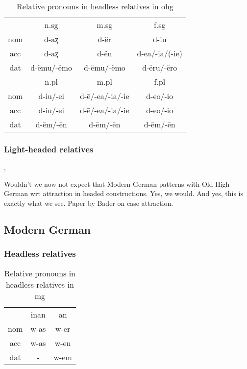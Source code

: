 \begin{table}[H]\label{tbl:paradigmohg}
	\center
	\caption {Relative pronouns in headless relatives in \ac{ohg}}
		\begin{tabular}{cccc}
		\toprule
							& \ac{n}.\ac{sg}	& \ac{m}.\ac{sg}  & \ac{f}.\ac{sg}	\\
								\cmidrule{2-4}
		\ac{nom}	& d-aȥ          	& d-ër       			& d-iu						\\
		\ac{acc}	& d-aȥ   					& d-ën						& d-ea/-ia/(-ie)	\\
		\ac{dat}	& d-ëmu/-ëmo	    & d-ëmu/-ëmo			& d-ëru/-ëro			\\
		\bottomrule
	    				& \ac{n}.\ac{pl}	& \ac{m}.\ac{pl}  	& \ac{f}.\ac{pl}	\\
	    					\cmidrule{2-4}
    \ac{nom} 	& d-iu/-ei   			&  d-ē/-ea/-ia/-ie	& d-eo/-io        \\
    \ac{acc} 	& d-iu/-ei   			&  d-ē/-ea/-ia/-ie	& d-eo/-io        \\
    \ac{dat} 	& d-ēm/-ēn   			&  d-ēm/-ēn       	& d-ēm/-ēn        \\
    \bottomrule
		\end{tabular}
\end{table}

\subsubsection{Light-headed relatives}

, 

Wouldn't we now not expect that Modern German patterns with Old High German wrt attraction in headed constructions. Yes, we would. And yes, this is exactly what we see. Paper by Bader on case attraction.




\subsection{Modern German}

\subsubsection{Headless relatives}


\begin{table}[H]
	\center
	\caption {Relative pronouns in headless relatives in \ac{mg}}
		\begin{tabular}{ccc}
		\toprule
							& \ac{inan}	& \ac{an}	\\
								\cmidrule{2-3}
    \ac{nom} 	& w-as    	& w-er   	\\
    \ac{acc} 	& w-as    	& w-en  	\\
    \ac{dat} 	& -  				& w-em   	\\
		\bottomrule
		\end{tabular}
\end{table}

